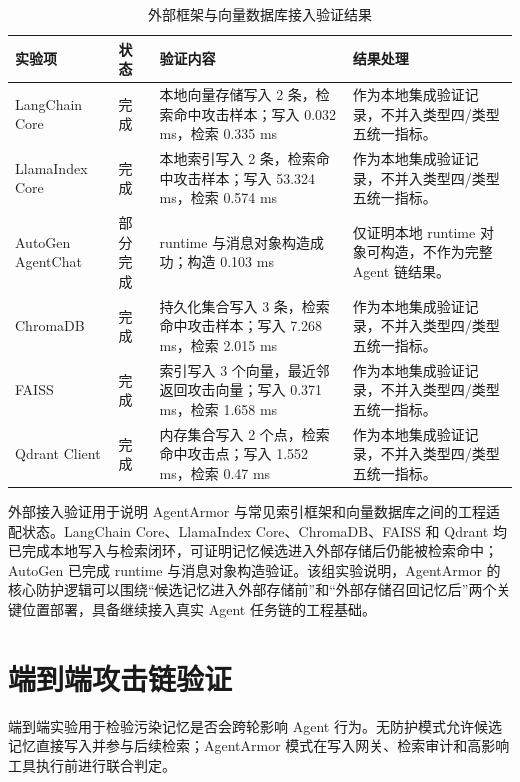 \documentclass[UTF8,zihao=-4,oneside,fontset=none]{ctexrep}
\begin{document}
\begin{table}[H]
\centering
\caption{外部框架与向量数据库接入验证结果}
\small
\setlength{\tabcolsep}{4pt}
\renewcommand{\arraystretch}{1.28}
\begin{tabular}{@{}M{0.19\textwidth}M{0.11\textwidth}M{0.31\textwidth}M{0.31\textwidth}@{}}
\toprule
实验项 & 状态 & 验证内容 & 结果处理 \\
\midrule
LangChain Core & 完成 & 本地向量存储写入 2 条，检索命中攻击样本；写入 0.032 ms，检索 0.335 ms & 作为本地集成验证记录，不并入类型四/类型五统一指标。 \\
\midrule
LlamaIndex Core & 完成 & 本地索引写入 2 条，检索命中攻击样本；写入 53.324 ms，检索 0.574 ms & 作为本地集成验证记录，不并入类型四/类型五统一指标。 \\
\midrule
AutoGen AgentChat & 部分完成 & runtime 与消息对象构造成功；构造 0.103 ms & 仅证明本地 runtime 对象可构造，不作为完整 Agent 链结果。 \\
\midrule
ChromaDB & 完成 & 持久化集合写入 3 条，检索命中攻击样本；写入 7.268 ms，检索 2.015 ms & 作为本地集成验证记录，不并入类型四/类型五统一指标。 \\
\midrule
FAISS & 完成 & 索引写入 3 个向量，最近邻返回攻击向量；写入 0.371 ms，检索 1.658 ms & 作为本地集成验证记录，不并入类型四/类型五统一指标。 \\
\midrule
Qdrant Client & 完成 & 内存集合写入 2 个点，检索命中攻击点；写入 1.552 ms，检索 0.47 ms & 作为本地集成验证记录，不并入类型四/类型五统一指标。 \\
\bottomrule
\end{tabular}
\end{table}

外部接入验证用于说明 AgentArmor 与常见索引框架和向量数据库之间的工程适配状态。LangChain Core、LlamaIndex Core、ChromaDB、FAISS 和 Qdrant 均已完成本地写入与检索闭环，可证明记忆候选进入外部存储后仍能被检索命中；AutoGen 已完成 runtime 与消息对象构造验证。该组实验说明，AgentArmor 的核心防护逻辑可以围绕“候选记忆进入外部存储前”和“外部存储召回记忆后”两个关键位置部署，具备继续接入真实 Agent 任务链的工程基础。

\section{端到端攻击链验证}

端到端实验用于检验污染记忆是否会跨轮影响 Agent 行为。无防护模式允许候选记忆直接写入并参与后续检索；AgentArmor 模式在写入网关、检索审计和高影响工具执行前进行联合判定。
\end{document}
